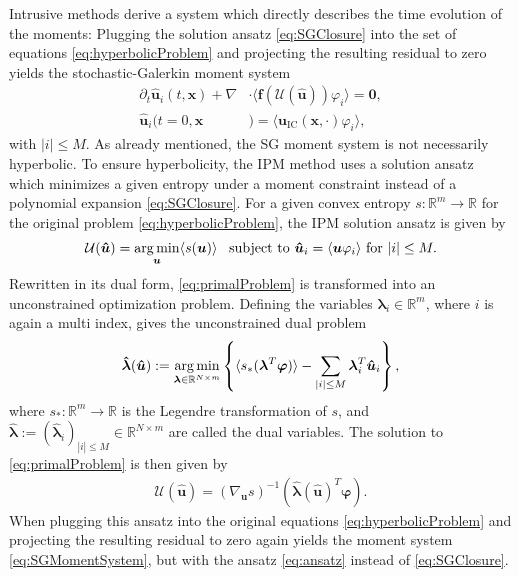 Intrusive methods derive a system which directly describes the time evolution of the moments: Plugging the solution ansatz \eqref{eq:SGClosure} into the set of equations \eqref{eq:hyperbolicProblem} and projecting the resulting residual to zero yields the stochastic-Galerkin moment system
\begin{subequations}\label{eq:SGMomentSystem}
\begin{align}
\partial_t \bm{\hat u}_i(t,\bm{x}) + \nabla&\cdot\langle\bm{f}(\mathcal{U}(\bm{\hat u})) \varphi_i\rangle = \bm{0}, \\
\bm{\hat u}_i(t=0,\bm{x}&) = \langle\bm{u}_{\text{IC}}(\bm{x},\cdot)\varphi_i\rangle,
\end{align}
\end{subequations}
with $|i|\leq M$. As already mentioned, the SG moment system is not necessarily hyperbolic. To ensure hyperbolicity, the IPM method uses a solution ansatz which minimizes a given entropy under a moment constraint instead of a polynomial expansion \eqref{eq:SGClosure}. For a given convex entropy $s:\mathbb{R}^m\to\mathbb{R}$ for the original problem \eqref{eq:hyperbolicProblem}, the IPM solution ansatz is given by
\begin{align}\label{eq:primalProblem}
\mathcal{U}(\bm{\hat u}) = \operatorname*{arg\,min}_{\bm u} \langle s(\bm u) \rangle \enskip \text{ subject to } \bm{\hat u}_i = \langle \bm u \varphi_i \rangle \text{ for } |i| \leq M.
\end{align}
Rewritten in its dual form, \eqref{eq:primalProblem} is transformed into an unconstrained optimization problem. Defining the variables $\bm{\lambda}_i\in\mathbb{R}^m$, where $i$ is again a multi index, gives the unconstrained dual problem
\begin{align}\label{eq:dualProblem}
 \bm{\hat \lambda}(\bm{\hat u}) := \operatorname*{arg\,min}_{\bm{\lambda} \in \mathbb{R}^{N \times m}}
  \left\{\langle s_*(\bm{\lambda}^T \bm\varphi)\rangle - \sum_{|i|\leq M}\bm{\lambda}_i^T \bm{\hat u}_i\right\},
\end{align}
where $s_*:\mathbb{R}^m\to\mathbb{R}$ is the Legendre transformation of $s$, and $\bm{ \hat\lambda}:=(\bm{\hat{\lambda}}_i)_{|i|\leq M}\in \mathbb{R}^{N \times m}$ are called the dual variables. The solution to \eqref{eq:primalProblem} is then given by
\begin{align}\label{eq:ansatz}
 \mathcal{U}(\bm{\hat u}) = \left( \nabla_{\bm{u}} s \right)^{-1}(\bm{\hat{\lambda}}(\bm{\hat u})^T \bm{\varphi}).
\end{align}
When plugging this ansatz into the original equations \eqref{eq:hyperbolicProblem} and projecting the resulting residual to zero again yields the moment system \eqref{eq:SGMomentSystem}, but with the ansatz \eqref{eq:ansatz} instead of \eqref{eq:SGClosure}.



